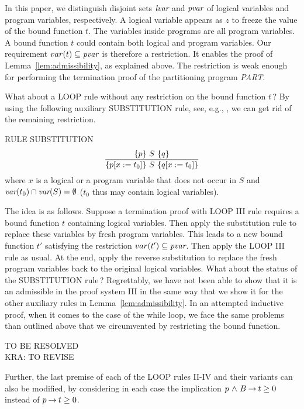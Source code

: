 \documentclass[runningheads]{llncs}       %
\begin{document}
In this paper, we distinguish disjoint sets $\mbox{\it lvar}$ and $\mbox{\it pvar}$
of logical variables and program variables, respectively.
A logical variable appears as $z$ to freeze the value of the bound function $t$.
The variables inside programs are all program variables.
A bound function $t$ could contain both logical and program variables.
Our requirement $var(t) \subseteq \mbox{\it pvar}$ is therefore a restriction.
It enables the proof of Lemma~\ref{lem:admissibility}, as explained above.
The restriction is weak enough for performing the termination proof
of the partitioning program {\it PART}.

What about a LOOP rule without any restriction on the bound function $t$\,?
By using the following auxiliary SUBSTITUTION rule, see, e.g., \cite{ABO09},
we can get rid of the remaining restriction.

\III
\NI
RULE \label{rul:SUBST} SUBSTITUTION 
\[ 
 \frac{ \mbox{$\{{p}\}\ {S}\ \{{q}\}$}          }
      { \mbox{$\{{p[x:=t_0]}\}\ {S}\ \{{q[x:=t_0]}\}$}    }
\]
where $x$ is a logical or a program variable
that does not occur in $S$ and 
$\mbox{\it var}(t_0)\cap \mbox{\it var}(S)=\emptyset$ ($t_0$ thus may contain logical variables).
\III

The idea is as follows. Suppose a termination proof with LOOP III rule
requires a bound function $t$ containing logical variables.
Then apply the substitution rule to replace these variables by fresh program variables.
This leads to a new bound function $t'$ satisfying the restriction 
$var(t') \subseteq \mbox{\it pvar}$. Then apply the LOOP III rule as usual.
At the end, apply the reverse substitution to replace the fresh program variables
back to the original logical variables.
What about the status of the SUBSTITUTION rule\,?
Regrettably, we have not been able to show that it is an admissible in the proof system III
in the same way that we show it for the other auxiliary rules in Lemma~\ref{lem:admissibility}.
In an attempted inductive proof, when it comes to the case of the while loop,
we face the same problems than outlined above that we circumvented by
restricting the bound function.





\vspace{5mm}

\NI
TO BE RESOLVED 
\\
KRA: TO REVISE

Further, the last premise of each of the LOOP rules II-IV and their
variants can also be modified, by considering in each case the
implication $p \mbox{$\ \wedge\ $} B \mbox{$\:\rightarrow\:$} t \geq 0$ instead of $p \mbox{$\:\rightarrow\:$} t \geq 0$. 
\end{document}
